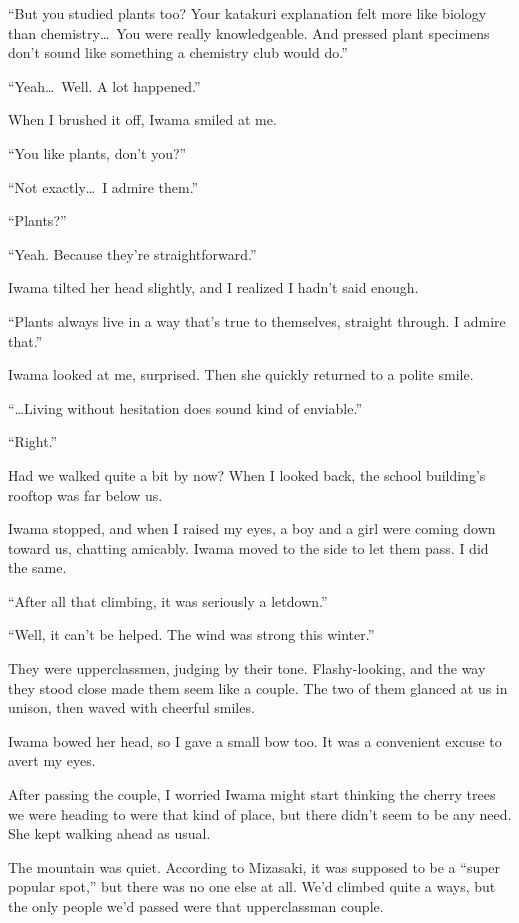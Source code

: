 \documentclass[
    a4paper,
    12pt,
    twoside,
    openany,
    UTF8,
    fontset=windows
]{ctexbook}
\begin{document}
``But you studied plants too? Your katakuri explanation felt more like biology than chemistry\dots\ You were really knowledgeable. And pressed plant specimens don't sound like something a chemistry club would do.''

``Yeah\dots\ Well. A lot happened.''

When I brushed it off, Iwama smiled at me.

``You like plants, don't you?''

``Not exactly\dots\ I admire them.''

``Plants?''

``Yeah. Because they're straightforward.''

Iwama tilted her head slightly, and I realized I hadn't said enough.

``Plants always live in a way that's true to themselves, straight through. I admire that.''

Iwama looked at me, surprised. Then she quickly returned to a polite smile.

``\dots Living without hesitation does sound kind of enviable.''

``Right.''

Had we walked quite a bit by now? When I looked back, the school building's rooftop was far below us.

Iwama stopped, and when I raised my eyes, a boy and a girl were coming down toward us, chatting amicably. Iwama moved to the side to let them pass. I did the same.

``After all that climbing, it was seriously a letdown.''

``Well, it can't be helped. The wind was strong this winter.''

They were upperclassmen, judging by their tone. Flashy-looking, and the way they stood close made them seem like a couple. The two of them glanced at us in unison, then waved with cheerful smiles.

Iwama bowed her head, so I gave a small bow too. It was a convenient excuse to avert my eyes.

After passing the couple, I worried Iwama might start thinking the cherry trees we were heading to were that kind of place, but there didn't seem to be any need. She kept walking ahead as usual.

The mountain was quiet. According to Mizasaki, it was supposed to be a ``super popular spot,'' but there was no one else at all. We'd climbed quite a ways, but the only people we'd passed were that upperclassman couple.
\end{document}
